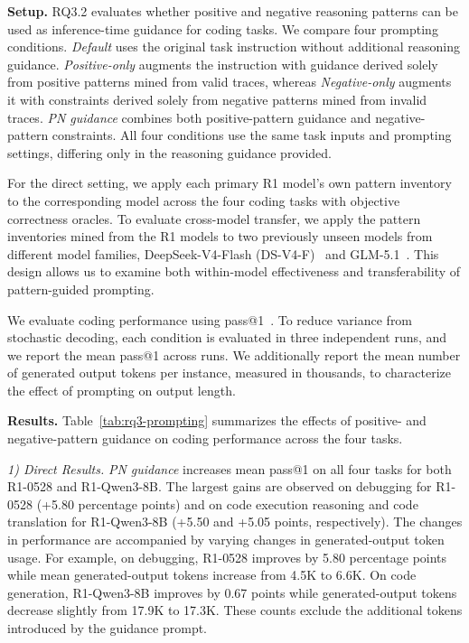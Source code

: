 \documentclass[acmsmall,screen,review,anonymous]{acmart}
\begin{document}
\textbf{Setup.}
RQ3.2 evaluates whether positive and negative reasoning patterns can be used as inference-time guidance for coding tasks. We compare four prompting conditions. \textit{Default} uses the original task instruction without additional reasoning guidance. \textit{Positive-only} augments the instruction with guidance derived solely from positive patterns mined from valid traces, whereas \textit{Negative-only} augments it with constraints derived solely from negative patterns mined from invalid traces. \textit{PN guidance} combines both positive-pattern guidance and negative-pattern constraints. All four conditions use the same task inputs and prompting settings, differing only in the reasoning guidance provided.

For the direct setting, we apply each primary R1 model's own pattern inventory to the corresponding model across the four coding tasks with objective correctness oracles. To evaluate cross-model transfer, we apply the pattern inventories mined from the R1 models to two previously unseen models from different model families, DeepSeek-V4-Flash (DS-V4-F)~\cite{deepseekv4} and GLM-5.1~\cite{glm51}. This design allows us to examine both within-model effectiveness and transferability of pattern-guided prompting.

We evaluate coding performance using pass@1~\cite{codex}. To reduce variance from stochastic decoding, each condition is evaluated in three independent runs, and we report the mean pass@1 across runs. We additionally report the mean number of generated output tokens per instance, measured in thousands, to characterize the effect of prompting on output length.



\textbf{Results.}
Table~\ref{tab:rq3-prompting} summarizes the effects of positive- and negative-pattern guidance on coding performance across the four tasks.

\textit{1) Direct Results.}
\textit{PN guidance} increases mean pass@1 on all four tasks for both R1-0528 and R1-Qwen3-8B. The largest gains are observed on debugging for R1-0528 (+5.80 percentage points) and on code execution reasoning and code translation for R1-Qwen3-8B (+5.50 and +5.05 points, respectively). The changes in performance are accompanied by varying changes in generated-output token usage. For example, on debugging, R1-0528 improves by 5.80 percentage points while mean generated-output tokens increase from 4.5K to 6.6K. On code generation, R1-Qwen3-8B improves by 0.67 points while generated-output tokens decrease slightly from 17.9K to 17.3K. These counts exclude the additional tokens introduced by the guidance prompt.
\end{document}

